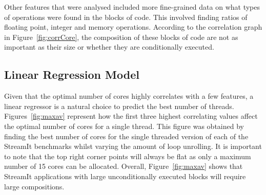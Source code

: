 Other features that were analysed included more fine-grained data on what types of operations were found in the blocks of code.
This involved finding ratios of floating point, integer and memory operations.
According to the correlation graph in Figure~\ref{fig:corrCore}, the composition of these blocks of code are not as important as their size or whether they are conditionally executed.


\subsection{Linear Regression Model}
Given that the optimal number of cores highly correlates with a few features, a linear regressor is a natural choice to predict the best number of threads.
Figures~\ref{fig:maxav} represent how the first three highest correlating values affect the optimal number of cores for a single thread.
This figure was obtained by finding the best number of cores for the single threaded version of each of the StreamIt benchmarks whilst varying the amount of loop unrolling.
It is important to note that the top right corner points will always be flat as only a maximum number of 15 cores can be allocated.
Overall, Figure~\ref{fig:maxav} shows that StreamIt applications with large unconditionally executed blocks will require large compositions.



